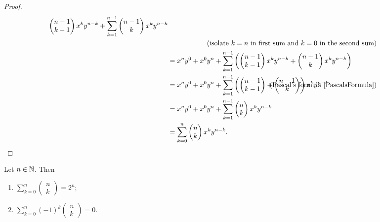 \begin{proof}
\begin{align*}
\begin{pmatrix}
n-1 \\ k-1
\end{pmatrix}x^{k} y^{n-k} + \sum_{k=1}^{n-1} \begin{pmatrix}
n-1 \\ k
\end{pmatrix}x^{k} y^{n-k} \\
&&\hspace{-22em}\text{(isolate $k=n$ in first sum and $k=0$ in the second sum)}& \\
&= x^ny^{0} + x^0y^n + \sum_{k=1}^{n-1} \left(\begin{pmatrix}
n-1 \\ k-1
\end{pmatrix}x^{k} y^{n-k} + \begin{pmatrix}
n-1 \\ k
\end{pmatrix}x^{k} y^{n-k}\right) \\
&= x^ny^{0} + x^0y^n + \sum_{k=1}^{n-1} \left(\begin{pmatrix}
n-1 \\ k-1
\end{pmatrix} + \begin{pmatrix}
n-1 \\ k
\end{pmatrix}\right)x^{k} y^{n-k} &\hspace{-22em}\text{(Pascal's formula \ref{PascalsFormula})}& \\
&= x^ny^{0} + x^0y^n + \sum_{k=1}^{n-1} \begin{pmatrix}
n \\ k
\end{pmatrix}x^{k} y^{n-k} \\
&= \sum_{k=0}^{n} \begin{pmatrix}
n \\ k
\end{pmatrix}x^{k} y^{n-k}.
\end{align*}
\end{proof}
\begin{corollary} \label{consequencesBinomialIdentity}
Let $n\in \mathbb{N}$. Then
\begin{enumerate}
\item $\sum_{k=0}^n \begin{pmatrix}
n \\ k
\end{pmatrix} = 2^n$;
\item $\sum_{k=0}^n (-1)^k\begin{pmatrix}
n \\ k
\end{pmatrix} = 0$.
\end{enumerate}
\end{corollary}
